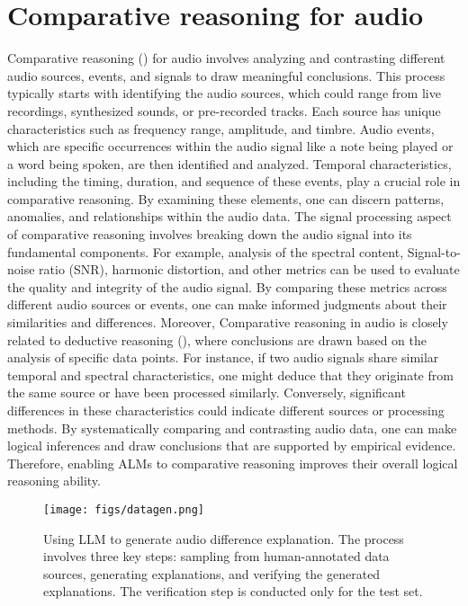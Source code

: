 \section{Comparative reasoning for audio}  \vspace{-0.1in}
Comparative reasoning (\cite{yu2023pre}) for audio involves analyzing and contrasting different audio sources, events, and signals to draw meaningful conclusions. This process typically starts with identifying the audio sources, which could range from live recordings, synthesized sounds, or pre-recorded tracks. Each source has unique characteristics such as frequency range, amplitude, and timbre. Audio events, which are specific occurrences within the audio signal like a note being played or a word being spoken, are then identified and analyzed. Temporal characteristics, including the timing, duration, and sequence of these events, play a crucial role in comparative reasoning. By examining these elements, one can discern patterns, anomalies, and relationships within the audio data. The signal processing aspect of comparative reasoning involves breaking down the audio signal into its fundamental components. For example, analysis of the spectral content, Signal-to-noise ratio (SNR), harmonic distortion, and other metrics can be used to evaluate the quality and integrity of the audio signal. By comparing these metrics across different audio sources or events, one can make informed judgments about their similarities and differences. Moreover, Comparative reasoning in audio is closely related to deductive reasoning (\cite{johnson1999deductive}), where conclusions are drawn based on the analysis of specific data points. For instance, if two audio signals share similar temporal and spectral characteristics, one might deduce that they originate from the same source or have been processed similarly. Conversely, significant differences in these characteristics could indicate different sources or processing methods. By systematically comparing and contrasting audio data, one can make logical inferences and draw conclusions that are supported by empirical evidence. Therefore, enabling ALMs to comparative reasoning improves their overall logical reasoning ability. 

\begin{figure*}[ht]
   \centering
     \texttt{[image: figs/datagen.png]}
     \caption{\small Using LLM to generate audio difference explanation. The process involves three key steps: sampling from human-annotated data sources, generating explanations, and verifying the generated explanations. The verification step is conducted only for the test set.
     }
     \label{fig:datagen}
\end{figure*}


